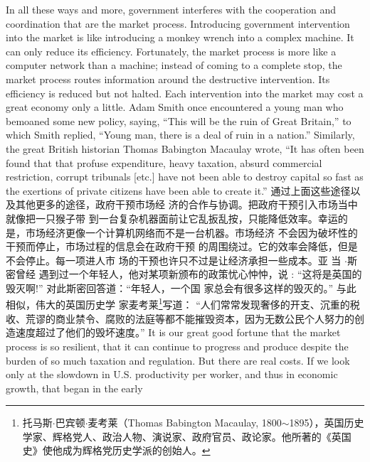 \begin{paracol}{2}
In all these ways and more, government interferes with the cooperation and coordination that are the market process. Introducing government intervention into the market is like
introducing a monkey wrench into a complex machine. It can
only reduce its efficiency. Fortunately, the market process is
more like a computer network than a machine; instead of coming to a complete stop, the market process routes information
around the destructive intervention. Its efficiency is reduced
but not halted. Each intervention into the market may cost a
great economy only a little. Adam Smith once encountered a
young man who bemoaned some new policy, saying, ``This will
be the ruin of Great Britain,'' to which Smith replied, ``Young
man, there is a deal of ruin in a nation.'' Similarly, the great
British historian Thomas Babington Macaulay wrote, ``It has
often been found that that profuse expenditure, heavy taxation,
absurd commercial restriction, corrupt tribunals [etc.] have not
been able to destroy capital so fast as the exertions of private
citizens have been able to create it.''
\switchcolumn
通过上面这些途径以及其他更多的途径，政府干预市场经
济的合作与协调。把政府干预引入市场当中就像把一只猴子带
到一台复杂机器面前让它乱扳乱按，只能降低效率。幸运的
是，市场经济更像一个计算机网络而不是一台机器。市场经济
不会因为破坏性的干预而停止，市场过程的信息会在政府干预
的周围绕过。它的效率会降低，但是不会停止。每一项进人市
场的干预也许只不过是让经济承担一些成本。亚 当 $\cdot$斯密曾经
遇到过一个年轻人，他对某项新颁布的政策忧心忡忡，说 :
“这将是英国的毁灭啊!” 对此斯密回答道：“年轻人，一个国
家总会有很多这样的毁灭的。” 与此相似，伟大的英国历史学
家麦考莱\footnote{托马斯$\cdot$巴宾顿$\cdot$麦考莱（Thomas Babington Macaulay, 1800$\sim$1895），英国历史学家、辉格党人、政治人物、演说家、政府官员、政论家。他所著的《英国史》使他成为辉格党历史学派的创始人。}写道： “人们常常发现奢侈的开支、沉重的税收、荒谬的商业禁令、腐败的法庭等都不能摧毁资本，因为无数公民个人努力的创造速度超过了他们的毁坏速度。”
\switchcolumn*
It is our great good fortune that the market process is so resilient, that it can continue to progress and produce despite the
burden of so much taxation and regulation. But there are real
costs. If we look only at the slowdown in U.S. productivity per
worker, and thus in economic growth, that began in the early

\end{paracol}
